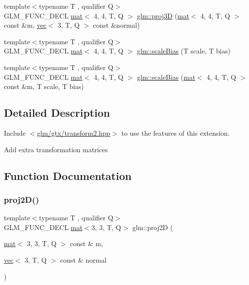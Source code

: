\begin{DoxyCompactItemize}
\item 
{\footnotesize template$<$typename T , qualifier Q$>$ }\\G\+L\+M\+\_\+\+F\+U\+N\+C\+\_\+\+D\+E\+CL \hyperlink{structglm_1_1mat}{mat}$<$ 4, 4, T, Q $>$ \hyperlink{group__gtx__transform2_gaa2b7f4f15b98f697caede11bef50509e}{glm\+::proj3D} (\hyperlink{structglm_1_1mat}{mat}$<$ 4, 4, T, Q $>$ const \&m, \hyperlink{structglm_1_1vec}{vec}$<$ 3, T, Q $>$ const \&normal)
\item 
{\footnotesize template$<$typename T , qualifier Q$>$ }\\G\+L\+M\+\_\+\+F\+U\+N\+C\+\_\+\+D\+E\+CL \hyperlink{structglm_1_1mat}{mat}$<$ 4, 4, T, Q $>$ \hyperlink{group__gtx__transform2_gabf249498b236e62c983d90d30d63c99c}{glm\+::scale\+Bias} (T scale, T bias)
\item 
{\footnotesize template$<$typename T , qualifier Q$>$ }\\G\+L\+M\+\_\+\+F\+U\+N\+C\+\_\+\+D\+E\+CL \hyperlink{structglm_1_1mat}{mat}$<$ 4, 4, T, Q $>$ \hyperlink{group__gtx__transform2_gae2bdd91a76759fecfbaef97e3020aa8e}{glm\+::scale\+Bias} (\hyperlink{structglm_1_1mat}{mat}$<$ 4, 4, T, Q $>$ const \&m, T scale, T bias)
\end{DoxyCompactItemize}


\subsection{Detailed Description}
Include $<$\hyperlink{transform2_8hpp}{glm/gtx/transform2.\+hpp}$>$ to use the features of this extension.

Add extra transformation matrices 

\subsection{Function Documentation}
\mbox{\label{group__gtx__transform2_ga5b992a0cdc8298054edb68e228f0d93e}} 
\subsubsection{\texorpdfstring{proj2\+D()}{proj2D()}}
{\footnotesize\ttfamily template$<$typename T , qualifier Q$>$ \\
G\+L\+M\+\_\+\+F\+U\+N\+C\+\_\+\+D\+E\+CL \hyperlink{structglm_1_1mat}{mat}$<$3, 3, T, Q$>$ glm\+::proj2D (\begin{DoxyParamCaption}\item[{\hyperlink{structglm_1_1mat}{mat}$<$ 3, 3, T, Q $>$ const \&}]{m,  }\item[{\hyperlink{structglm_1_1vec}{vec}$<$ 3, T, Q $>$ const \&}]{normal }\end{DoxyParamCaption})}



